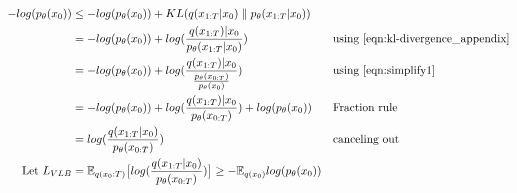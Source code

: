 \begin{subequations}
	\label{eqn:vlb2_appendix}
	\begin{align}
		-log(p_\theta(x_0)) &\leq -log(p_\theta(x_0)) + KL(q(x_{1:T}|x_0) \parallel p_\theta(x_{1:T}|x_0)) &&\textrm{}\\
		&= -log(p_\theta(x_0)) + log(\frac{q(x_{1:T})|x_0}{p_\theta(x_{1:T}|x_0)}) && \textrm{using \autoref{eqn:kl-divergence_appendix}}\\
		&=-log(p_\theta(x_0)) + log(\frac{q(x_{1:T})|x_0}{\frac{p_\theta(x_{0:T})}{p_\theta(x_{0})}}) && \textrm{using \autoref{eqn:simplify1}}\\
		&= -log(p_\theta(x_0)) + log(\frac{q(x_{1:T})|x_0}{p_\theta(x_{0:T})})+log(p_\theta(x_{0})) && \textrm{Fraction rule}\\
		&= log(\frac{q(x_{1:T}|x_0)}{p_\theta(x_{0:T})})	&& \textrm{canceling out}\\
		\textrm{Let }L_{VLB} &= \mathbb{E}_{q(x_0:T)}\big[log(\frac{q(x_{1:T}|x_0)}{p_\theta(x_{0:T})}) \big] \geq - \mathbb{E}_{q(x_0)}log(p_\theta(x_0))
	\end{align}
\end{subequations}


